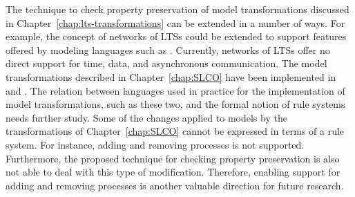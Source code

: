 The technique to check property preservation of model transformations discussed in Chapter~\ref{chap:lts-transformations} can be extended in a number of ways.
For example, the concept of networks of LTSs could be extended to support features offered by modeling languages such as \SLCO.
Currently, networks of LTSs offer no direct support for time, data, and asynchronous communication.
The model transformations described in Chapter~\ref{chap:SLCO} have been implemented in \Xtend and \ATL.
The relation between languages used in practice for the implementation of model transformations, such as these two, and the formal notion of rule systems needs further study.
Some of the changes applied to models by the transformations of Chapter~\ref{chap:SLCO} cannot be expressed in terms of a rule system.
For instance, adding and removing processes is not supported.
Furthermore, the proposed technique for checking property preservation is also not able to deal with this type of modification.
Therefore, enabling support for adding and removing processes is another valuable direction for future research. 